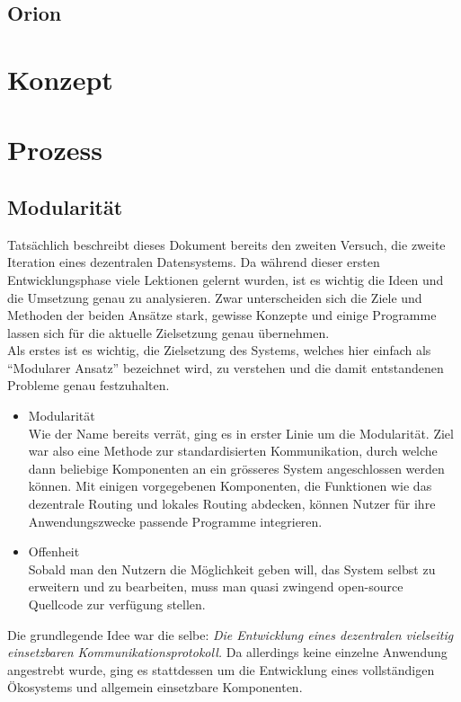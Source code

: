 \documentclass[11pt]{article}
\begin{document}
\subsection{Orion}
\label{sec:org5af8fa3}
\section{Konzept}
\label{sec:org402a573}
\section{Prozess}
\label{sec:orgb303ac5}
\subsection{Modularität}
\label{sec:orged95685}
Tatsächlich beschreibt dieses Dokument bereits den zweiten Versuch,
die zweite Iteration eines dezentralen Datensystems. Da während dieser
ersten Entwicklungsphase viele Lektionen gelernt wurden, ist es
wichtig die Ideen und die Umsetzung genau zu analysieren. Zwar
unterscheiden sich die Ziele und Methoden der beiden Ansätze stark,
gewisse Konzepte und einige Programme lassen sich für die aktuelle
Zielsetzung genau übernehmen.\\

\noindent Als erstes ist es wichtig, die Zielsetzung des Systems,
welches hier einfach als “Modularer Ansatz” bezeichnet wird, zu
verstehen und die damit entstandenen Probleme genau festzuhalten.
\begin{itemize}
\item Modularität \\
Wie der Name bereits verrät, ging es in erster Linie um die
Modularität. Ziel war also eine Methode zur standardisierten
Kommunikation, durch welche dann beliebige Komponenten an ein
grösseres System angeschlossen werden können. Mit einigen
vorgegebenen Komponenten, die Funktionen wie das dezentrale Routing
und lokales Routing abdecken, können Nutzer für ihre
Anwendungszwecke passende Programme integrieren.
\item Offenheit \\
Sobald man den Nutzern die Möglichkeit geben will, das System selbst
zu erweitern und zu bearbeiten, muss man quasi zwingend open-source
Quellcode zur verfügung stellen.
\end{itemize}

\noindent Die grundlegende Idee war die selbe: \emph{Die Entwicklung eines
dezentralen vielseitig einsetzbaren Kommunikationsprotokoll.} Da
allerdings keine einzelne Anwendung angestrebt wurde, ging es
stattdessen um die Entwicklung eines vollständigen Ökosystems und
allgemein einsetzbare Komponenten.\\
\end{document}
